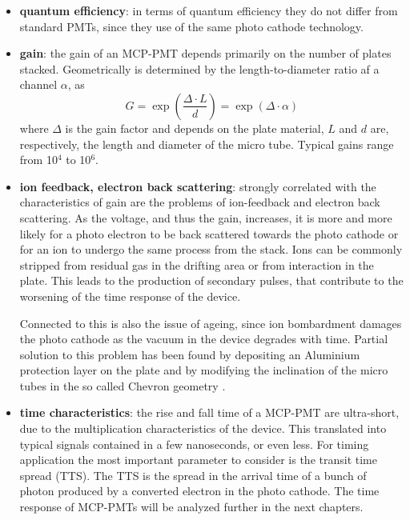 \begin{itemize}
\item \textbf{quantum efficiency}: in terms of quantum efficiency they do not differ from standard PMTs, since they use of the same photo cathode technology.
\item \textbf{gain}: the gain of an MCP-PMT depends primarily on the number of plates stacked. Geometrically is determined by the length-to-diameter ratio af a channel $\alpha$, as
\begin{equation}
G = \exp{\left( \frac{\Delta \cdot L}{d} \right)} = \exp{\left( \Delta \cdot \alpha \right)}
\end{equation}
where $\Delta$ is the gain factor and depends on the plate material, $L$ and $d$ are, respectively, the length and diameter of the micro tube.
Typical gains range from 10$^{4}$ to 10$^{6}$.
\item \textbf{ion feedback, electron back scattering}: strongly correlated with the characteristics of gain are the problems of ion-feedback and electron back scattering. As the voltage, and thus the gain, increases, it is more and more likely for a photo electron to be back scattered towards the photo cathode or for an ion to undergo the same process from the stack. Ions can be commonly stripped from residual gas in the drifting area or from interaction in the plate.
This leads to the production of secondary pulses, that contribute to the worsening of the time response of the device.

Connected to this is also the issue of ageing, since ion bombardment damages the photo cathode as the vacuum in the device degrades with time.
Partial solution to this problem has been found by depositing an Aluminium protection layer on the plate and by modifying the inclination of the micro tubes in the so called Chevron geometry \cite{Vavra2004}.

\item \textbf{time characteristics}: the rise and fall time of a MCP-PMT are ultra-short, due to the multiplication characteristics of the device. This translated into typical signals contained in a few nanoseconds, or even less. For timing application the most important parameter to consider is the transit time spread (TTS). The TTS is the spread in the arrival time of a bunch of photon produced by a converted electron in the photo cathode. The time response of MCP-PMTs will be analyzed further in the next chapters.

\end{itemize}

